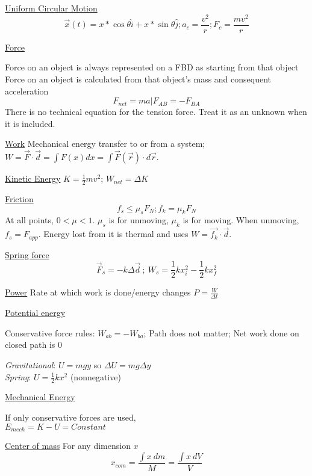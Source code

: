 \documentclass[8pt]{minimal}
\begin{document}
\underline{Uniform Circular Motion}
\begin{equation*}
    \vec{x}(t)=x*\cos\theta \hat{i} + x*\sin\theta \hat{j}  ;a_c=\frac{v^2}{r} ; F_c=\frac{mv^2}{r}
\end{equation*}

\pagebreak
\underline{Force}

Force on an object is always represented on a FBD as starting from that object\\
Force on an object is calculated from that object's mass and consequent acceleration
\begin{equation*}
    F_{net}=ma      |      F_{AB}=-F_{BA}
\end{equation*}
There is no technical equation for the tension force. Treat it as an unknown when it is included.

\underline{Work} Mechanical energy transfer to or from a system; $W = \vec{F}\cdot\vec{d} = \int F(x) dx = \int \vec{F}(\vec{r})\cdot d\vec{r}$.

\underline{Kinetic Energy} $K = \frac{1}{2}mv^2$; $W_{net} = \Delta K$

\underline{Friction}
\begin{equation*}
    f_s \le \mu_s F_N ; f_k = \mu_k F_N
\end{equation*}
At all points, $0 < \mu < 1$. $\mu_s$ is for unmoving, $\mu_k$ is for moving. When unmoving, $f_s = F_{app}$.
Energy lost from it is thermal and uses $W = \vec{f_k} \cdot \vec{d}$.

\underline{Spring force}
\begin{equation*}
    \vec{F}_s = -k\Delta\vec{d}\ ;\ W_s = \frac{1}{2}kx_i^2 - \frac{1}{2}kx_f^2
\end{equation*}

\underline{Power} Rate at which work is done/energy changes $P = \frac{W}{\Delta t}$

\underline{Potential energy}

Conservative force rules: $W_{ab} = -W_{ba}$; Path does not matter; Net work done on closed path is 0


\textit{Gravitational}: $U = mgy$ so $\Delta U = mg\Delta y$\\
\textit{Spring}: $U = \frac{1}{2}kx^2$ (nonnegative)

\underline{Mechanical Energy}

If only conservative forces are used, \\$E_{mech}= K - U = Constant$

\underline{Center of mass} For any dimension $x$ 
\begin{equation*}
    x_{com} = \frac{\int x\ dm}{M} = \frac{\int x\ dV}{V}
\end{equation*}
\end{document}
